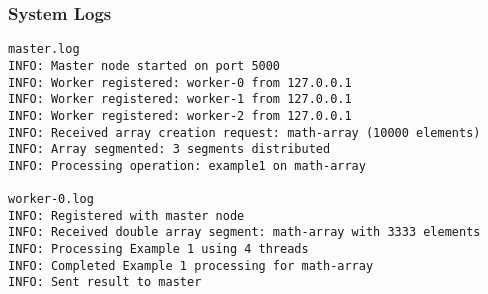 \documentclass{beamer}
\begin{document}
\begin{frame}[fragile]
\frametitle{System Logs}
\begin{lstlisting}[style=terminal]
master.log
INFO: Master node started on port 5000
INFO: Worker registered: worker-0 from 127.0.0.1
INFO: Worker registered: worker-1 from 127.0.0.1
INFO: Worker registered: worker-2 from 127.0.0.1
INFO: Received array creation request: math-array (10000 elements)
INFO: Array segmented: 3 segments distributed
INFO: Processing operation: example1 on math-array

worker-0.log
INFO: Registered with master node
INFO: Received double array segment: math-array with 3333 elements
INFO: Processing Example 1 using 4 threads
INFO: Completed Example 1 processing for math-array
INFO: Sent result to master
\end{lstlisting}
\end{frame}
\end{document}
